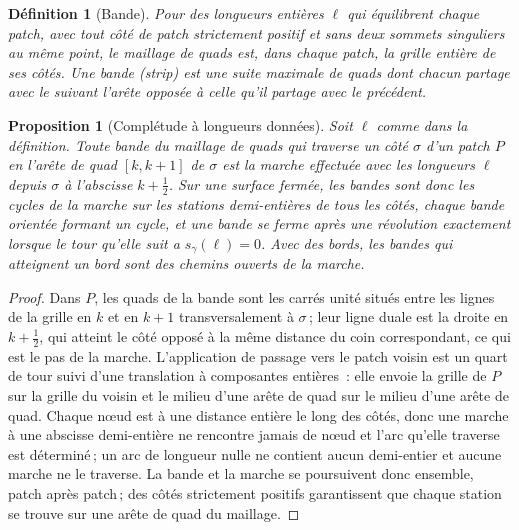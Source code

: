 \documentclass[11pt,a4paper]{article}
\newtheorem{definition}{Définition}
\newtheorem{proposition}{Proposition}
\newcommand{\shift}{s}
\newcommand{\lean}[1]{\texttt{\detokenize{#1}}}
\newenvironment{evidence}[3][]{}{}
\begin{document}
\begin{definition}[Bande]
Pour des longueurs entières $\ell$ qui équilibrent chaque patch, avec tout
côté de patch strictement positif et sans deux sommets singuliers au même
point, le maillage de quads est, dans chaque patch, la grille entière de ses
côtés. Une \emph{bande} (\emph{strip}) est une suite maximale de quads dont
chacun partage avec le suivant l'arête opposée à celle qu'il partage avec le
précédent.
\end{definition}

\begin{evidence}{core}{\lean{TMesh.completeness_tmesh}, à partir de \lean{Completeness.completeness_at_given_lengths} et \lean{TMesh.closedGluing} (le recollement des arêtes unité lu sur le T-maillage, biunivoque à longueurs entières équilibrées), \lean{TMesh.walk_stations}, \lean{TMesh.arcAt_of_unit_edge}\,; supposé~: que les cycles du modèle sont les bandes du maillage\,; les bandes qui atteignent un bord ne sont pas formalisées}
\begin{proposition}[Complétude à longueurs données]\label{prop:complete}
Soit $\ell$ comme dans la définition. Toute bande du maillage de quads qui
traverse un côté $\sigma$ d'un patch $P$ en l'arête de quad $[k, k+1]$ de
$\sigma$ est la marche effectuée \emph{avec les longueurs $\ell$} depuis
$\sigma$ à l'abscisse $k + \tfrac12$. Sur une surface fermée, les bandes
sont donc les cycles de la marche sur les stations demi-entières de tous les
côtés, chaque bande orientée formant un cycle, et une bande se ferme après
une révolution exactement lorsque le tour qu'elle suit a
$\shift_\gamma(\ell) = 0$. Avec des bords, les bandes qui atteignent un bord
sont des chemins ouverts de la marche.
\end{proposition}
\end{evidence}

\begin{proof}
Dans $P$, les quads de la bande sont les carrés unité situés entre les
lignes de la grille en $k$ et en $k+1$ transversalement à $\sigma$\,; leur
ligne duale est la droite en $k + \tfrac12$, qui atteint le côté opposé à la
même distance du coin correspondant, ce qui est le pas de la marche.
L'application de passage vers le patch voisin est un quart de tour suivi
d'une translation à composantes entières~: elle envoie la grille de $P$ sur
la grille du voisin et le milieu d'une arête de quad sur le milieu d'une
arête de quad. Chaque nœud est à une distance entière le long des côtés,
donc une marche à une abscisse demi-entière ne rencontre jamais de nœud et
l'arc qu'elle traverse est déterminé\,; un arc de longueur nulle ne contient
aucun demi-entier et aucune marche ne le traverse. La bande et la marche se
poursuivent donc ensemble, patch après patch\,; des côtés strictement
positifs garantissent que chaque station se trouve sur une arête de quad du
maillage.
\end{proof}
\end{document}

